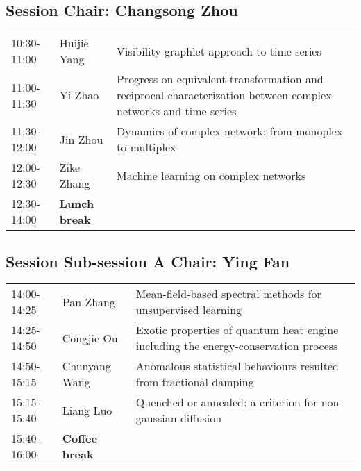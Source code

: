 \documentclass[oneside,A4paper,12pt]{article}
\begin{document}
\subsection*{Session \uppercase\expandafter{}  \hspace{10mm} Chair: Changsong Zhou}
\label{sec:org9b73502}


\begin{center}
\begin{tabular}{p{2.5cm}p{4cm}p{8.5cm}}
\hline
10:30-11:00 & Huijie Yang & Visibility graphlet approach to time series\\
11:00-11:30 & Yi Zhao & Progress on equivalent transformation and reciprocal characterization between complex networks and time series\\
11:30-12:00 & Jin Zhou & Dynamics of complex network: from monoplex to multiplex\\
12:00-12:30 & Zike Zhang & Machine learning on complex networks\\
\cellcolor{blue!25}12:30-14:00 & \cellcolor{blue!25}\textbf{Lunch break} & \cellcolor{blue!25}\\
\hline
\end{tabular}
\end{center}

\newpage


\subsection*{Session \uppercase\expandafter{} \hspace{10mm} Sub-session A \hspace{10mm} Chair: Ying Fan}
\label{sec:org75b9c08}

\begin{center}
\begin{tabular}{p{2.5cm}p{4cm}p{8.5cm}}
\hline
14:00-14:25 & Pan Zhang & Mean-field-based spectral methods for unsupervised learning\\
14:25-14:50 & Congjie Ou & Exotic properties of quantum heat engine including the energy-conservation process\\
14:50-15:15 & Chunyang Wang & Anomalous statistical behaviours resulted from fractional damping\\
15:15-15:40 & Liang Luo & Quenched or annealed: a criterion for non-gaussian diffusion\\
\cellcolor{blue!25}15:40-16:00 & \cellcolor{blue!25}\textbf{Coffee break} & \cellcolor{blue!25}\\
\hline
\end{tabular}
\end{center}
\end{document}
